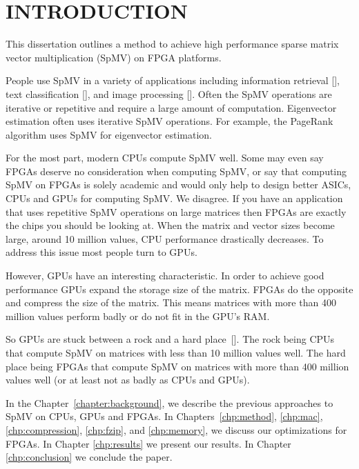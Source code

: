 \chapter{INTRODUCTION}
\label{chapter:introduction}
This dissertation outlines a method to achieve high performance sparse matrix vector multiplication (SpMV) on FPGA platforms.
\par People use SpMV in a variety of applications including information retrieval [\cite{prelim:page}], text classification [\cite{prelim:townsend2}], and image processing [\cite{prelim:wang}]. Often the SpMV operations are iterative or repetitive and require a large amount of computation. Eigenvector estimation often uses iterative SpMV operations. For example, the PageRank algorithm uses SpMV for eigenvector estimation.
\par For the most part, modern CPUs compute SpMV well. Some may even say FPGAs deserve no consideration when computing SpMV, or say that computing SpMV on FPGAs is solely academic and would only help to design better ASICs, CPUs and GPUs for computing SpMV. We disagree. If you have  an application that uses repetitive SpMV operations on large matrices then FPGAs are exactly the chips you should be looking at. When the matrix and vector sizes  become large, around 10 million values, CPU performance drastically decreases. To address this issue most people turn to GPUs.
\par However, GPUs have an interesting characteristic. In order to achieve good performance GPUs expand the storage size of the matrix. FPGAs do the opposite and compress the size of the matrix. This means matrices with more than 400 million values perform badly or do not fit in the GPU's RAM.
\par So GPUs are stuck between a rock and a hard place~[\cite{prelim:davis0}]. The rock being CPUs that compute SpMV on matrices with less than 10 million values well. The hard place being FPGAs that compute SpMV on matrices with more than 400 million values well (or at least not as badly as CPUs and GPUs).
\par In the Chapter~\ref{chapter:background}, we describe the previous approaches to SpMV on CPUs, GPUs and FPGAs. In Chapters~\ref{chp:method}, \ref{chp:mac}, \ref{chp:compression}, \ref{chp:fzip}, and \ref{chp:memory}, we discuss our optimizations for FPGAs. In Chapter \ref{chp:results} we present our results. In Chapter \ref{chp:conclusion} we conclude the paper.
